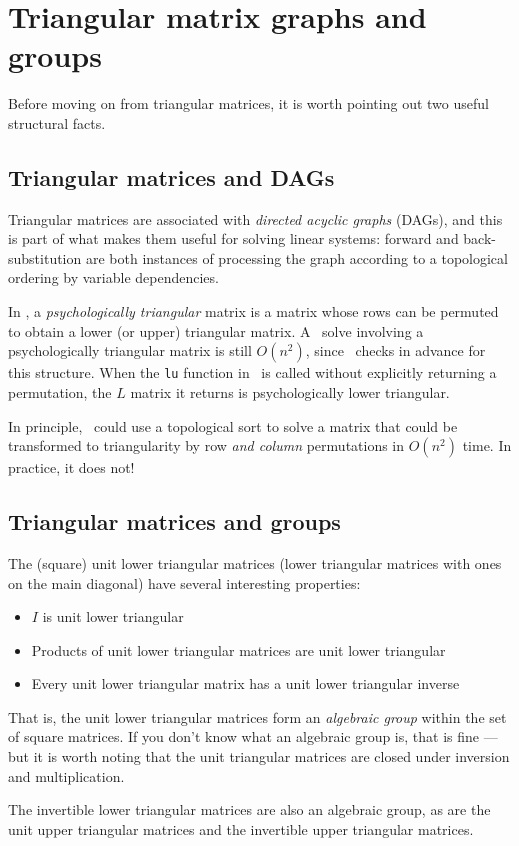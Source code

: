 \section{Triangular matrix graphs and groups}

Before moving on from triangular matrices, it is worth pointing
out two useful structural facts.

\subsection{Triangular matrices and DAGs}

Triangular matrices are associated with {\em directed acyclic graphs}
(DAGs), and this is part of what makes them useful for solving linear
systems: forward and back-substitution are both instances of processing
the graph according to a topological ordering by variable dependencies.

In \matlab, a {\em psychologically triangular} matrix is a matrix whose
rows can be permuted to obtain a lower (or upper) triangular matrix.  A
\matlab\ solve involving a psychologically triangular matrix is still
$O(n^2)$, since \matlab\ checks in advance for this structure.  When the
{\tt lu} function in \matlab\ is called without explicitly returning a
permutation, the $L$ matrix it returns is psychologically lower
triangular.

In principle, \matlab\ could use a topological sort to solve a
matrix that could be transformed to triangularity by row {\em and column}
permutations in $O(n^2)$ time.  In practice, it does not!

\subsection{Triangular matrices and groups}


The (square) unit lower triangular matrices (lower triangular matrices with
ones on the main diagonal) have several interesting properties:
\begin{itemize}
\item $I$ is unit lower triangular
\item Products of unit lower triangular matrices are unit lower triangular
\item Every unit lower triangular matrix has a unit lower triangular
  inverse
\end{itemize}
That is, the unit lower triangular matrices form an {\em algebraic group}
within the set of square matrices.  If you don't know what an algebraic
group is, that is fine --- but it is worth noting that the unit triangular
matrices are closed under inversion and multiplication.

The invertible lower triangular matrices are also an algebraic group,
as are the unit upper triangular matrices and the invertible upper
triangular matrices.
